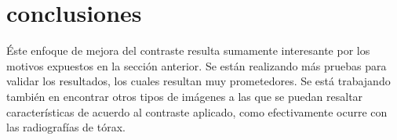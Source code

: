 \documentclass[spanish,twocolumn]{article}
\begin{document}
\section{conclusiones}
\label{sec:conclusion}
Éste enfoque de mejora del contraste resulta sumamente interesante por los motivos expuestos en la sección anterior. Se están realizando más pruebas para validar los resultados, los cuales resultan muy prometedores. Se está trabajando también en encontrar otros tipos de imágenes a las que se puedan resaltar características de acuerdo al contraste aplicado, como efectivamente ocurre con las radiografías de tórax.




%
%
%


\end{document}
